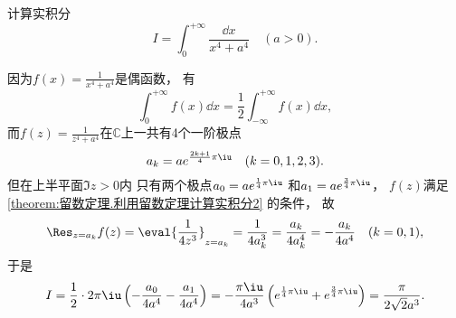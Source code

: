 \begin{example}
计算实积分\begin{equation*}
	I = \int_0^{+\infty} \frac{\dd{x}}{x^4+a^4} \quad(a>0).
\end{equation*}
\begin{solution}
因为\(f(x) = \frac{1}{x^4+a^4}\)是偶函数，
有\begin{equation*}
	\int_0^{+\infty} f(x) \dd{x}
	= \frac{1}{2} \int_{-\infty}^{+\infty} f(x) \dd{x},
\end{equation*}
而\(f(z) = \frac{1}{z^4+a^4}\)在\(\mathbb{C}\)上一共有4个一阶极点\begin{equation*}
	a_k = a e^{\frac{2k+1}{4}\pi\iu} \quad(k=0,1,2,3).
\end{equation*}
但在上半平面\(\Im z > 0\)内
只有两个极点\(a_0 = a e^{\frac{1}{4}\pi\iu}\)
和\(a_1 = a e^{\frac{3}{4}\pi\iu}\)，
\(f(z)\)满足\cref{theorem:留数定理.利用留数定理计算实积分2} 的条件，
故\begin{equation*}
	\Res_{z=a_k} f(z)
	= \eval{\frac{1}{4z^3}}_{z=a_k}
	= \frac{1}{4a_k^3}
	= \frac{a_k}{4a_k^4}
	= -\frac{a_k}{4a^4}
	\quad(k=0,1),
\end{equation*}
于是\begin{equation*}
	I = \frac{1}{2} \cdot 2\pi\iu \left(-\frac{a_0}{4a^4}-\frac{a_1}{4a^4}\right)
	= -\frac{\pi\iu}{4a^3} \left(e^{\frac{1}{4}\pi\iu} + e^{\frac{3}{4}\pi\iu}\right)
	= \frac{\pi}{2\sqrt{2}a^3}.
\end{equation*}
\end{solution}
\end{example}

